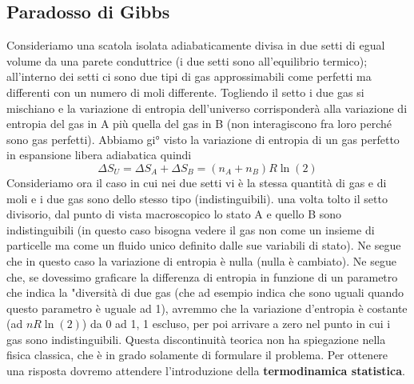 \documentclass[10pt,a4paper]{article}
\begin{document}
\subsection{Paradosso di Gibbs}
Consideriamo una scatola isolata adiabaticamente divisa in due setti di egual volume da una parete conduttrice (i due setti sono all'equilibrio termico); all'interno dei setti ci sono due tipi di gas approssimabili come perfetti ma differenti con un numero di moli differente. Togliendo il setto i due gas si mischiano e la variazione di entropia dell'universo corrisponderà alla variazione di entropia del gas in A più quella del gas in B (non interagiscono fra loro perché sono gas perfetti). Abbiamo gi° visto la variazione di entropia di un gas perfetto in espansione libera adiabatica quindi
\[\Delta S_U = \Delta S_A + \Delta S_B = (n_A + n_B)R\ln(2)\]
Consideriamo ora il caso in cui nei due setti vi è la stessa quantità di gas e di moli e i due gas sono dello stesso tipo (indistinguibili). una volta tolto il setto divisorio, dal punto di vista macroscopico lo stato A e quello B sono indistinguibili (in questo caso bisogna vedere il gas non come un insieme di particelle ma come un fluido unico definito dalle sue variabili di stato). Ne segue che in questo caso la variazione di entropia è nulla (nulla è cambiato). Ne segue che, se dovessimo graficare la differenza di entropia in funzione di un parametro che indica la "diversità di due gas (che ad esempio indica che sono uguali quando questo parametro è uguale ad 1), avremmo che la variazione d'entropia è costante (ad \(nR\ln(2)\)) da 0 ad 1, 1 escluso, per poi arrivare a zero nel punto in cui i gas sono indistinguibili. Questa discontinuità teorica non ha spiegazione nella fisica classica, che è in grado solamente di formulare il problema. Per ottenere una risposta dovremo attendere l'introduzione della \textbf{termodinamica statistica}.
\end{document}
